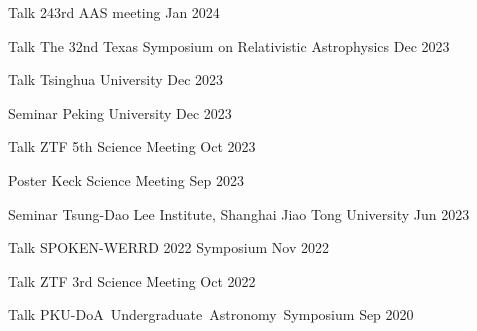 


\begin{cventries}
	
	\cvsimpentry
	{Talk}
	{243rd AAS meeting}
	{Jan 2024}
	{}

	\cvsimpentry
	{Talk}
	{The 32nd Texas Symposium on Relativistic Astrophysics}
	{Dec 2023}
	{}

	\cvsimpentry
	{Talk}
	{Tsinghua University}
	{Dec 2023}
	{}

	\cvsimpentry
	{Seminar}
	{Peking University}
	{Dec 2023}
	{}

	\cvsimpentry
	{Talk}
	{ZTF 5th Science Meeting}
	{Oct 2023}
	{}
	
	\cvsimpentry
	{Poster}
	{Keck Science Meeting}
	{Sep 2023}
	{}

	\cvsimpentry
	{Seminar}
	{Tsung-Dao Lee Institute, Shanghai Jiao Tong University}
	{Jun 2023}
	{}

	\cvsimpentry
	{Talk}
	{SPOKEN-WERRD 2022 Symposium} %
	{Nov 2022} %
	{}

	\cvsimpentry
	{Talk} %
	{ZTF 3rd Science Meeting} %
	{Oct 2022} %
	{}
	
	\cvsimpentry
	{Talk} %
	{PKU-DoA Undergraduate Astronomy Symposium} %
	{Sep 2020} %
	{}

\end{cventries}